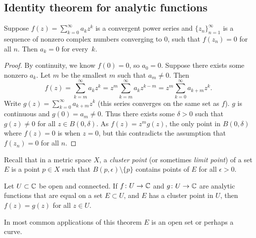 \subsection{Identity theorem for analytic functions}

\begin{lemma}
Suppose $f(z) = \sum_{k=0}^\infty a_k z^k$ is a convergent power series and
$\{ z_n \}_{n=1}^\infty$ is a sequence of nonzero complex numbers converging to 0,
such that $f(z_n) = 0$ for all $n$.  Then $a_k = 0$ for every~$k$.
\end{lemma}

\begin{proof}
By continuity, we know $f(0) = 0$, so $a_0 = 0$.
Suppose there exists some nonzero $a_k$.
Let $m$ be the smallest $m$ such that $a_m \neq 0$.  Then
\begin{equation*}
f(z) = \sum_{k=m}^\infty a_k z^k = 
z^m \sum_{k=m}^\infty a_k z^{k-m} =
z^m \sum_{k=0}^\infty a_{k+m} z^{k} .
\end{equation*}
Write $g(z) = \sum_{k=0}^\infty a_{k+m} z^{k}$ (this series converges
on the same set as $f$).  $g$ is continuous and $g(0) = a_m \neq 0$.  Thus
there exists some $\delta > 0$ such that $g(z) \neq 0$ for all $z \in
B(0,\delta)$.  As $f(z) = z^m g(z)$, the only point in $B(0,\delta)$ where
$f(z) = 0$ is when $z=0$, but this contradicts the assumption
that $f(z_n) = 0$ for all $n$.
\end{proof}

Recall that in a metric space $X$, a \emph{cluster point}
(or sometimes \emph{limit point}) of a set
$E$ is a point $p \in X$ such that
$B(p,\epsilon) \setminus \{ p \}$ contains points of $E$
for all $\epsilon > 0$.

\begin{thm}
\label{thm:identityanalytic}%
%
Let $U \subset {\mathbb{C}}$ be open and connected.  If $f \colon U \to {\mathbb{C}}$
and $g \colon U \to {\mathbb{C}}$ are analytic functions that are
equal on a set $E \subset U$, and $E$ has a cluster point
in $U$, then $f(z) = g(z)$ for all $z \in U$.
\end{thm}

In most common applications of this theorem $E$ is an open set or perhaps a curve.

